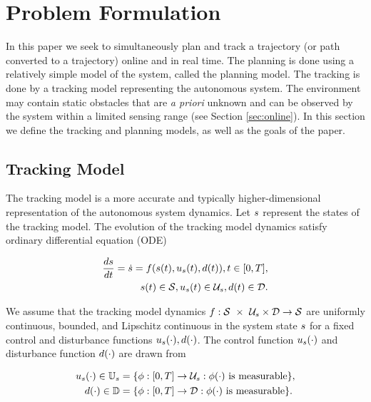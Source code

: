 \section{Problem Formulation \label{sec:formulation}}
In this paper we seek to simultaneously plan and track a trajectory (or path converted to a trajectory) online and in real time. 
The planning is done using a relatively simple model of the system, called the planning model. 
The tracking is done by a tracking model representing the autonomous system. 
The environment may contain static obstacles that are \textit{a priori} unknown and can be observed by the system within a limited sensing range (see Section \ref{sec:online}). 
In this section we define the tracking and planning models, as well as the goals of the paper.

\subsection{Tracking  Model}
The tracking model is a more accurate and typically higher-dimensional representation of the autonomous system dynamics. 
Let $s$ represent the states of the tracking model. 
The evolution of the tracking model dynamics satisfy ordinary differential equation (ODE)

\begin{equation}
\begin{aligned}
\label{eq:tdyn}
\frac{d\tstate}{d\tvar} = \dot{\tstate} = \tdyn(\tstate(\tvar), \tctrl(\tvar), \dstb(\tvar)), \tvar \in [0, \thor], \\
\tstate(\tvar) \in \tset, \tctrl(\tvar) \in \tcset, \dstb(\tvar) \in \dset.
\end{aligned}
\end{equation}

We assume that the tracking model dynamics $f : \mathcal{S}\ \times\ \mathcal{U}_s \times \mathcal{D} \rightarrow \mathcal{S}$ are uniformly continuous, bounded, and Lipschitz continuous in the system state $s$ for a fixed control and disturbance functions $u_s(\cdot), d(\cdot)$. The control function $u_s(\cdot)$ and disturbance function $d(\cdot)$ are drawn from

\begin{align}
u_s(\cdot) \in \mathbb{U}_s &= \{\phi: [0, T] \rightarrow \mathcal{U}_s: \phi(\cdot) \text{ is measurable}\},\\
d(\cdot) \in \mathbb{D} &= \{\phi: [0, T] \rightarrow \mathcal{D}: \phi(\cdot) \text{ is measurable}\}.
\end{align}



